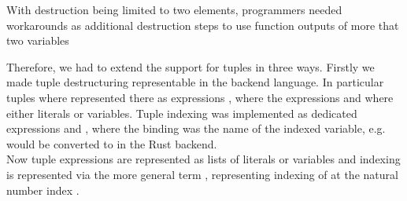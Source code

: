 \begin{codefigure}[H]
\centering
\tabskip=0pt
\caption{With destruction being limited to two elements, programmers needed workarounds as additional destruction steps to use function outputs of more that two variables}
\label{fig:DetructExample}
\end{codefigure}

Therefore, we had to extend the support for tuples in three ways. 
Firstly we made tuple destructuring representable in the backend language. In particular tuples where represented there as expressions , where the expressions  and  where either literals or variables. Tuple indexing was implemented as dedicated expressions  and , where the binding  was the name of the indexed variable, e.g.  would be converted to  in the Rust backend.\\

Now tuple expressions are represented as lists of literals or variables  and indexing is represented via the more general term , representing indexing of  at the natural number index . \\
